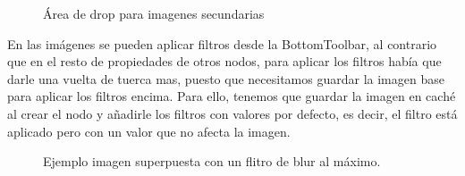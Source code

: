 \begin{figure}[!h]
  \centering
  \noindent{}
  \caption{Área de drop para imagenes secundarias}
\end{figure}

\newpage
En las imágenes se pueden aplicar filtros desde la BottomToolbar, al contrario que en el resto
de propiedades de otros nodos, para aplicar los filtros había que darle una vuelta de tuerca mas,
puesto que necesitamos guardar la imagen base para aplicar los filtros encima.
Para ello, tenemos que guardar la imagen en caché al crear el nodo y añadirle los filtros con 
valores por defecto, es decir, el filtro está aplicado pero con un valor que no afecta la imagen.

\begin{figure}[!h]
  \centering
  \noindent{}
  \caption{Ejemplo imagen superpuesta con un flitro de blur al máximo.}
\end{figure}

